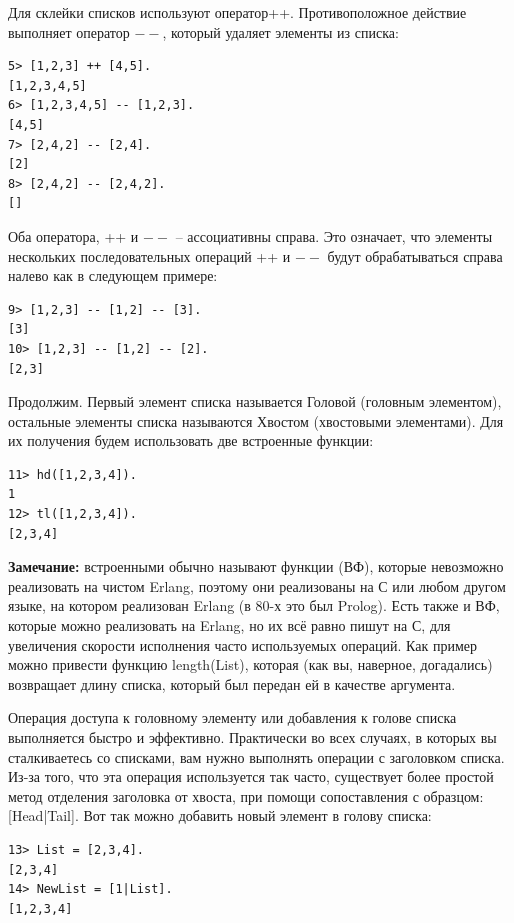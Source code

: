 \documentclass[a4paper,12pt]{report}
\newcommand{\ops}{\colorbox{lgreen}}
\begin{document}
Для склейки списков используют оператор\ops{++}. Противоположное действие выполняет оператор \ops{$--$}, который удаляет элементы из списка:
\begin{lstlisting}[style=repl]
5> [1,2,3] ++ [4,5].
[1,2,3,4,5]
6> [1,2,3,4,5] -- [1,2,3].
[4,5]
7> [2,4,2] -- [2,4].
[2]
8> [2,4,2] -- [2,4,2].
[]
\end{lstlisting}

Оба оператора, \ops{++} и \ops{$--$} \--- ассоциативны справа. Это означает, что элементы нескольких последовательных операций \ops{++} и \ops{$--$} будут обрабатываться справа налево как в следующем примере:
\begin{lstlisting}[style=repl]
9> [1,2,3] -- [1,2] -- [3].
[3]
10> [1,2,3] -- [1,2] -- [2].
[2,3]
\end{lstlisting}

Продолжим. Первый элемент списка называется Головой (головным элементом), остальные элементы списка называются Хвостом (хвостовыми элементами). Для их получения будем использовать две встроенные функции:
\begin{lstlisting}[style=repl]
11> hd([1,2,3,4]).
1
12> tl([1,2,3,4]).
[2,3,4]
\end{lstlisting}
\colorbox{lgray}
{
    \begin{minipage}{1.0\linewidth}
        \textbf{Замечание:} встроенными обычно называют функции (ВФ), которые невозможно реализовать на чистом Erlang, поэтому они реализованы на С или любом другом языке, на котором реализован Erlang (в 80\--х это был Prolog). Есть также и ВФ, которые можно реализовать на Erlang, но их всё равно пишут на С, для увеличения скорости исполнения часто используемых операций. Как пример можно привести функцию \ops{length(List)}, которая (как вы, наверное, догадались) возвращает длину списка, который был передан ей в качестве аргумента.
    \end{minipage}
}

Операция доступа к головному элементу или добавления к голове списка выполняется быстро и эффективно. Практически во всех случаях, в которых вы сталкиваетесь со списками, вам нужно выполнять операции с заголовком списка. Из\--за того, что эта операция используется так часто, существует более простой метод отделения заголовка от хвоста, при помощи сопоставления с образцом: \ops{[Head|Tail]}. Вот так можно добавить новый элемент в голову списка:
\begin{lstlisting}[style=repl]
13> List = [2,3,4].
[2,3,4]
14> NewList = [1|List].
[1,2,3,4]
\end{lstlisting}
\end{document}
